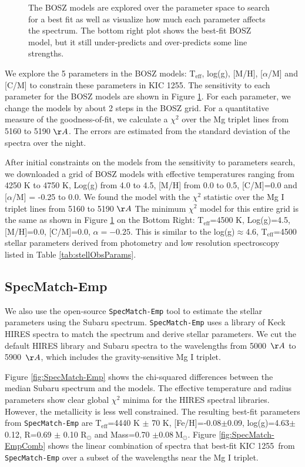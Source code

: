 \documentclass[preprint,trackchanges]{aastex61}
\newcommand{\shStar}{KIC 1255}
\begin{document}
\begin{figure}[!hbtp]
\begin{centering}
\caption{The BOSZ models are explored over the parameter space to search for a best fit as well as visualize how much each parameter affects the spectrum.
The bottom right plot shows the best-fit BOSZ model, but it still under-predicts and over-predicts some line strengths.}\label{fig:boszModelParamsMedianSpec}
\end{centering}
\end{figure}

We explore the 5 parameters in the BOSZ models: T$_\mathrm{eff}$, log(g), [M/H], [$\alpha$/M] and [C/M] to constrain these parameters in \shStar.
The sensitivity to each parameter for the BOSZ models are shown in Figure \ref{fig:boszModelParamsMedianSpec}.
For each parameter, we change the models by about 2 steps in the BOSZ grid.
For a quantitative measure of the goodness-of-fit, we calculate a $\chi^2$ over the Mg triplet lines from 5160 to 5190 $\AA$.
The errors are estimated from the standard deviation of the spectra over the night.

After initial constraints on the models from the sensitivity to parameters search, we downloaded a grid of BOSZ models with effective temperatures ranging from 4250 K to 4750 K, Log(g) from 4.0 to 4.5, [M/H] from 0.0 to 0.5, [C/M]=0.0 and [$\alpha$/M] = -0.25 to 0.0.
We found the model with the  $\chi^2$ statistic over the Mg I triplet lines from 5160 to 5190 $\AA$
The minimum $\chi^2$ model for this entire grid is the same as shown in Figure \ref{fig:boszModelParamsMedianSpec} on the Bottom Right: T$_\mathrm{eff}$=4500 K, Log(g)=4.5, [M/H]=0.0, [C/M]=0.0, $\alpha=-0.25$.
This is similar to the log(g)$\approx$4.6, T$_\mathrm{eff}$=4500 stellar parameters derived from photometry and low resolution spectroscopy listed in Table \ref{tab:stellObsParams}.

\subsection{SpecMatch-Emp}\label{sec:SpecMatch-Emp}

We also use the open-source \texttt{SpecMatch-Emp} tool \citep{yee2017specMatch} to estimate the stellar parameters using the Subaru spectrum.
\texttt{SpecMatch-Emp} uses a library of Keck HIRES spectra to match the spectrum and derive stellar parameters.
We cut the default HIRES library and Subaru spectra to the wavelengths from 5000~$\AA$ to 5900~$\AA$, which includes the gravity-sensitive Mg I triplet.

Figure \ref{fig:SpecMatch-Emp} shows the chi-squared differences between the median Subaru spectrum and the models.
The effective temperature and radius parameters show clear global $\chi^2$ minima for the HIRES spectral libraries.
However, the metallicity is less well constrained.
The resulting best-fit parameters from \texttt{SpecMatch-Emp} are T$_\mathrm{eff}$=4440 K $\pm$ 70 K, [Fe/H]=-0.08$\pm$0.09, log(g)=4.63$\pm$0.12, R=0.69 $\pm$ 0.10 R$_\odot$ and Mass=0.70 $\pm 0.08~$M$_\odot$.
Figure \ref{fig:SpecMatch-EmpComb} shows the linear combination of spectra that best-fit \shStar\ from \texttt{SpecMatch-Emp} over a subset of the wavelengths near the Mg I triplet.
\end{document}
